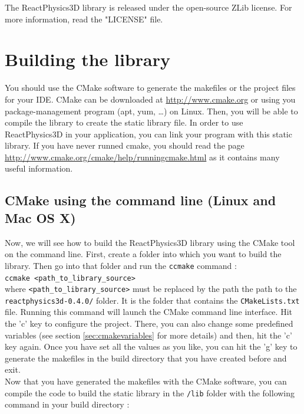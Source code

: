 \documentclass[a4paper,12pt]{article}
\begin{document}
    The ReactPhysics3D library is released under the open-source ZLib license. For more information, read the "LICENSE" file.

    \section{Building the library}
    \label{sec:building}

    You should use the CMake software to generate the makefiles or the 
    project files for your IDE. CMake can be downloaded at
    \url{http://www.cmake.org} or using you package-management program
    (apt, yum, \dots) on Linux. Then, you will be able to compile the library to create the static library
    file. In order to use ReactPhysics3D in your application, you can link your program with this static library.
    If you have never runned cmake, you should read the page \url{http://www.cmake.org/cmake/help/runningcmake.html} as
    it contains many useful information.

    \subsection{CMake using the command line (Linux and Mac OS X)}  

    Now, we will see how to build the ReactPhysics3D library using the CMake tool on the command line.
    First, create a folder into which you want to build the library. Then go into that folder and run
    the \texttt{ccmake} command : \\

    \texttt{ccmake \textless path\_to\_library\_source\textgreater} \\

    where \texttt{\textless path\_to\_library\_source\textgreater} must be replaced
    by the path the path to the \texttt{reactphysics3d-0.4.0/} folder. It is the folder that
    contains the \texttt{CMakeLists.txt} file. Running this command will launch the CMake command line interface.
    Hit the 'c' key to configure the project. There, you can also change some predefined variables (see section \ref{sec:cmakevariables} for more details)
    and then, hit the 'c' key again. Once you have set all the values as you like, you can hit the 'g' key to generate the makefiles in the build directory
    that you have created before and exit. \\

    Now that you have generated the makefiles with the CMake software, you can compile the code to build the static library in the
    \texttt{/lib} folder with the following command in your build directory : \\
    
\end{document}
